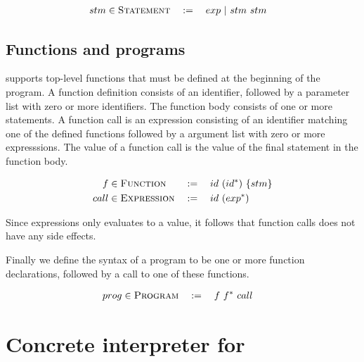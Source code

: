 \begin{alignat*}{3}
	stm & \in \textsc{Statement} && := \quad exp \alt stm \ stm
\end{alignat*}


\subsection{Functions and programs}
\explanguage supports top-level functions that must be defined at the beginning of the program. A function definition consists of an identifier, followed by a parameter list with zero or more identifiers. The function body consists of one or more statements. A function call is an expression consisting of an identifier matching one of the defined functions followed by a argument list with zero or more expresssions. The value of a function call is the value of the final statement in the function body. 

\begin{alignat*}{3}
	f & \in \textsc{Function} && := \quad id \ (id^{*}) \ \{stm\}\\
	call & \in \textsc{Expression} && := \quad id \ (exp^{*})
\end{alignat*}

Since expressions only evaluates to a value, it follows that function calls does not have any side effects.

Finally we define the syntax of a \explanguage program to be one or more function declarations, followed by a call to one of these functions. 

\begin{alignat*}{3}
	prog & \in \textsc{Program} && := \quad f \ f^{*} \ call
\end{alignat*}

\section{Concrete interpreter for \explanguage}


\iffalse
\begin{figure}[!h]
	\begin{lstlisting}[style=simple]
		object ConcreteGrammar {
			sealed trait ConcreteValue
			object ConcreteValue {\\
				case class True() extends ConcreteValue
				case class False() extends ConcreteValue
				case class IntValue(v: Int) extends ConcreteValue
				case class UnitValue() extends ConcreteValue
			}
			sealed trait Exp
			sealed trait Stm
			case class Id(s: String)
			case class FDecl(name: Id, params: List[Id], stm: Stm)
			case class Prog(funcs: HashMap[String, FDecl], fCall: CallExp)	
		}
	\end{lstlisting}
	\caption{High level overview of grammar implementation in \textsl{Scala}.}
\end{figure}
\fi

